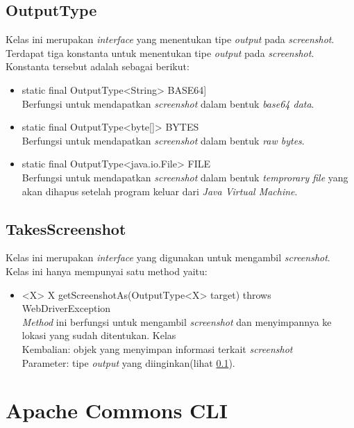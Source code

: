 \subsection{OutputType}
\label{subsec:output_type}
Kelas ini merupakan \textit{interface} yang menentukan tipe \textit{output} pada \textit{screenshot}\cite{Selenium_java_doc}. Terdapat tiga konstanta untuk menentukan tipe \textit{output} pada \textit{screenshot}. Konstanta tersebut adalah sebagai berikut:
\begin{itemize}
\item static final OutputType<String> BASE64]\\
Berfungsi untuk mendapatkan \textit{screenshot} dalam bentuk \textit{base64 data}.
\item static final OutputType<byte[]> BYTES\\
Berfungsi untuk mendapatkan \textit{screenshot} dalam bentuk \textit{raw bytes}.
\item static final OutputType<java.io.File> FILE\\
Berfungsi untuk mendapatkan \textit{screenshot} dalam bentuk \textit{temprorary file} yang akan dihapus setelah program keluar dari \textit{Java Virtual Machine}.
\end{itemize}


\subsection{TakesScreenshot}
\label{subsec:takes_screenshot}
Kelas ini merupakan \textit{interface} yang digunakan untuk mengambil \textit{screenshot}. Kelas ini hanya mempunyai satu method yaitu:
\begin{itemize}
\item <X> X getScreenshotAs(OutputType<X> target) throws WebDriverException\\
\textit{Method} ini berfungsi untuk mengambil \textit{screenshot} dan menyimpannya ke lokasi yang sudah ditentukan. Kelas\\
Kembalian: objek yang menyimpan informasi terkait \textit{screenshot} \\
Parameter: tipe \textit{output} yang diinginkan(lihat \ref{subsec:output_type}).

\end{itemize}


\section{Apache Commons CLI}
\label{subsec:apache_cli}
